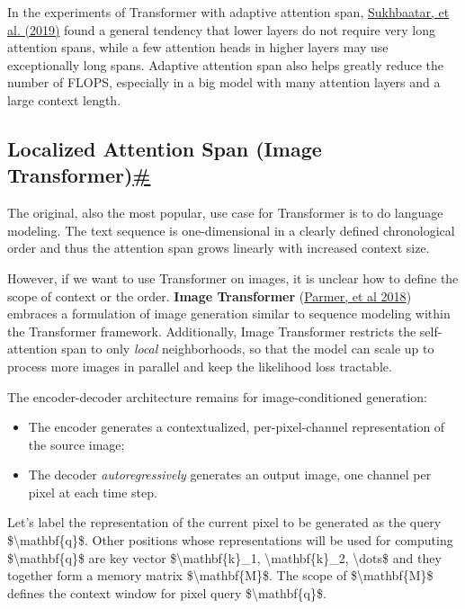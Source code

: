 In the experiments of Transformer with adaptive attention span, \href{https://arxiv.org/abs/1905.07799}{Sukhbaatar, et al. (2019)} found a general tendency that lower layers do not require very long attention spans, while a few attention heads in higher layers may use exceptionally long spans. Adaptive attention span also helps greatly reduce the number of FLOPS, especially in a big model with many attention layers and a large context length.

\subsection{\texorpdfstring{Localized Attention Span (Image Transformer)\hyperref[localized-attention-span-image-transformer]{\#}}{Localized Attention Span (Image Transformer)\#}}\label{localized-attention-span-image-transformer}

The original, also the most popular, use case for Transformer is to do language modeling. The text sequence is one-dimensional in a clearly defined chronological order and thus the attention span grows linearly with increased context size.

However, if we want to use Transformer on images, it is unclear how to define the scope of context or the order. \textbf{Image Transformer} (\href{https://arxiv.org/abs/1802.05751}{Parmer, et al 2018}) embraces a formulation of image generation similar to sequence modeling within the Transformer framework. Additionally, Image Transformer restricts the self-attention span to only \emph{local} neighborhoods, so that the model can scale up to process more images in parallel and keep the likelihood loss tractable.

The encoder-decoder architecture remains for image-conditioned generation:

\begin{itemize}
\tightlist
\item
  The encoder generates a contextualized, per-pixel-channel representation of the source image;
\item
  The decoder \emph{autoregressively} generates an output image, one channel per pixel at each time step.
\end{itemize}

Let's label the representation of the current pixel to be generated as the query \$\textbackslash mathbf\{q\}\$. Other positions whose representations will be used for computing \$\textbackslash mathbf\{q\}\$ are key vector \$\textbackslash mathbf\{k\}\_1, \textbackslash mathbf\{k\}\_2, \textbackslash dots\$ and they together form a memory matrix \$\textbackslash mathbf\{M\}\$. The scope of \$\textbackslash mathbf\{M\}\$ defines the context window for pixel query \$\textbackslash mathbf\{q\}\$.

